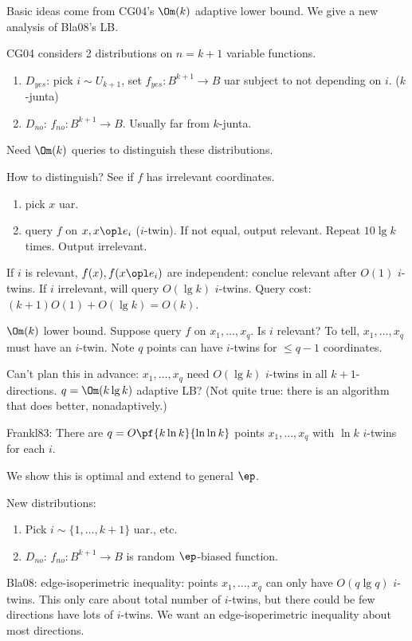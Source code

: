 Basic ideas come from CG04's $\Om(k)$ adaptive lower bound. We give a new analysis of Bla08's LB.

CG04 considers 2 distributions on $n=k+1$ variable functions. 
\begin{enumerate}
\item
$D_{yes}$: pick $i\sim U_{k+1}$, set $f_{yes}:B^{k+1}\to B$ uar subject to not depending on $i$. ($k$-junta)
\item
$D_{no}$: $f_{no}:B^{k+1}\to B$. Usually far from $k$-junta.
\end{enumerate}
Need $\Om(k)$ queries to distinguish these distributions.

How to distinguish? See if $f$ has irrelevant coordinates.
\begin{enumerate}
\item
pick $x$ uar.
\item
query $f$ on $x,x\opl e_i$ ($i$-twin). If not equal, output relevant. Repeat $10\lg k$ times. Output irrelevant.
\end{enumerate}
If $i$ is relevant, $f(x),f(x\opl e_i)$ are independent: conclue relevant after $O(1)$ $i$-twins. 
If $i$ irrelevant, will query $O(\lg k)$ $i$-twins. Query cost: $(k+1)O(1)+O(\lg k)= O(k)$.

$\Om(k)$ lower bound. Suppose query $f$ on $x_1,\ldots, x_q$. Is $i$ relevant? To tell, $x_1,\ldots, x_q$ must have an $i$-twin. Note $q$ points can have $i$-twins for $\le q-1$ coordinates.

Can't plan this in advance: $x_1,\ldots, x_q$ need $O(\lg k)$ $i$-twins in all $k+1$-directions. $q=\Om(k\lg k)$ adaptive LB? (Not quite true: there is an algorithm that does better, nonadaptively.)

Frankl83: There are $q=O\pf{k\ln k}{\ln \ln k}$ points $x_1,\ldots, x_q$ with $\ln k$ $i$-twins for each $i$.

We show this is optimal and extend to general $\ep$.

New distributions:
\begin{enumerate}
\item
Pick $i\sim \{1,\ldots, k+1\}$ uar., etc.
\item
$D_{no}$: $f_{no}:B^{k+1}\to B$ is random $\ep$-biased function.
\end{enumerate}

Bla08: edge-isoperimetric inequality: points $x_1,\ldots, x_q$ can only have $O(q\lg q)$ $i$-twins.
This only care about total number of $i$-twins, but there could be few directions have lots of $i$-twins. We want an edge-isoperimetric inequality about most directions.

